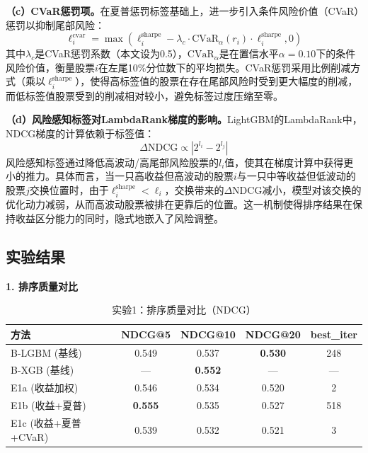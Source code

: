 \documentclass[11pt,a4paper]{ctexart}
\newcommand{\best}[1]{\textcolor{bestval}{\textbf{#1}}}
\newcommand{\second}[1]{\textcolor{secondval}{#1}}
\begin{document}
\textbf{（c）CVaR惩罚项。}在夏普惩罚标签基础上，进一步引入条件风险价值（CVaR）惩罚以抑制尾部风险：
\begin{equation}
\ell_i^{\text{cvar}} = \max\left(\ell_i^{\text{sharpe}} - \lambda_c \cdot \text{CVaR}_\alpha(r_i) \cdot \ell_i^{\text{sharpe}}, 0\right)
\label{eq:cvar_penalty}
\end{equation}
其中$\lambda_c$是CVaR惩罚系数（本文设为0.5），$\text{CVaR}_\alpha$是在置信水平$\alpha=0.10$下的条件风险价值，衡量股票$i$在左尾10\%分位数下的平均损失。CVaR惩罚采用比例削减方式（乘以$\ell_i^{\text{sharpe}}$），使得高标签值的股票在存在尾部风险时受到更大幅度的削减，而低标签值股票受到的削减相对较小，避免标签过度压缩至零。

\textbf{（d）风险感知标签对LambdaRank梯度的影响。}LightGBM的LambdaRank中，NDCG梯度的计算依赖于标签值：
\begin{equation}
\Delta\text{NDCG} \propto |2^{l_i} - 2^{l_j}|
\label{eq:ndcg_gradient}
\end{equation}
风险感知标签通过降低高波动/高尾部风险股票的$l_i$值，使其在梯度计算中获得更小的推力。具体而言，当一只高收益但高波动的股票$i$与一只中等收益但低波动的股票$j$交换位置时，由于$\ell_i^{\text{sharpe}} < \ell_i$，交换带来的$\Delta\text{NDCG}$减小，模型对该交换的优化动力减弱，从而高波动股票被排在更靠后的位置。这一机制使得排序结果在保持收益区分能力的同时，隐式地嵌入了风险调整。

\subsection{实验结果}


\textbf{1. 排序质量对比}

\begin{table}[htbp]
\centering
\caption{实验1：排序质量对比（NDCG）}
\label{tab:exp1-ndcg}
\begin{tabular}{lcccc}
\toprule
\textbf{方法} & \textbf{NDCG@5} & \textbf{NDCG@10} & \textbf{NDCG@20} & \textbf{best\_iter} \\
\midrule
B-LGBM (基线)       & \second{0.549} & \second{0.537} & \best{0.530} & 248 \\
B-XGB (基线)        & --- & \best{0.552} & --- & --- \\
E1a (收益加权)       & 0.546 & 0.534 & 0.520 & 2 \\
E1b (收益+夏普)      & \best{0.555} & \second{0.535} & \second{0.527} & 518 \\
E1c (收益+夏普+CVaR) & 0.539 & 0.532 & 0.521 & 3 \\
\bottomrule
\end{tabular}
\end{table}
\end{document}
